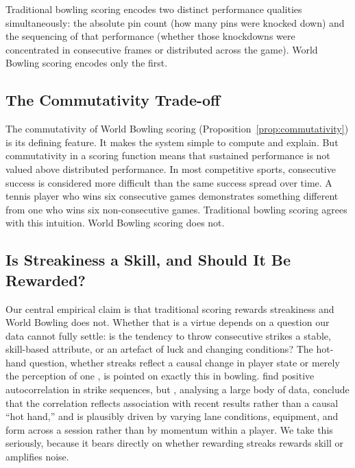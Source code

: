\documentclass[USenglish]{article}
\theoremstyle{dgthm}
\theoremstyle{dgdef}
\begin{document}
Traditional bowling scoring encodes two distinct performance qualities simultaneously: the absolute pin count (how many pins were knocked down) and the sequencing of that performance (whether those knockdowns were concentrated in consecutive frames or distributed across the game). World Bowling scoring encodes only the first.

\subsection{The Commutativity Trade-off}

The commutativity of World Bowling scoring (Proposition~\ref{prop:commutativity}) is its defining feature. It makes the system simple to compute and explain. But commutativity in a scoring function means that sustained performance is not valued above distributed performance. In most competitive sports, consecutive success is considered more difficult than the same success spread over time. A tennis player who wins six consecutive games demonstrates something different from one who wins six non-consecutive games. Traditional bowling scoring agrees with this intuition. World Bowling scoring does not.

\subsection{Is Streakiness a Skill, and Should It Be Rewarded?}

Our central empirical claim is that traditional scoring rewards streakiness and World Bowling does not. Whether that is a virtue depends on a question our data cannot fully settle: is the tendency to throw consecutive strikes a stable, skill-based attribute, or an artefact of luck and changing conditions? The hot-hand question, whether streaks reflect a causal change in player state or merely the perception of one \citep{gilovich1985}, is pointed on exactly this in bowling. \citet{dorseypalmateer2004} find positive autocorrelation in strike sequences, but \citet{yaari2012}, analysing a large body of data, conclude that the correlation reflects association with recent results rather than a causal ``hot hand,'' and is plausibly driven by varying lane conditions, equipment, and form across a session rather than by momentum within a player. We take this seriously, because it bears directly on whether rewarding streaks rewards skill or amplifies noise.
\end{document}
